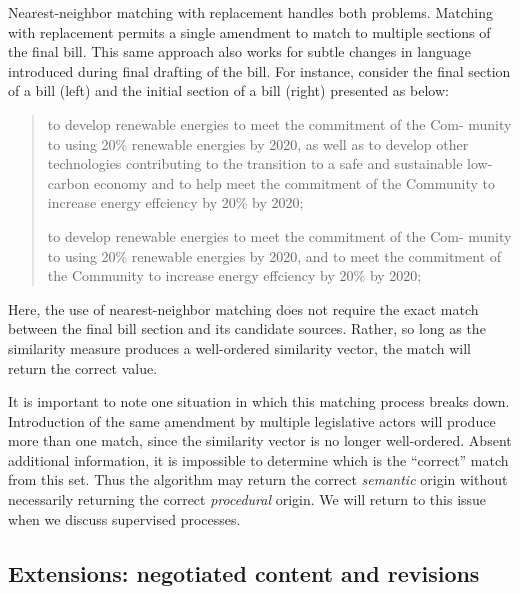 \documentclass[11pt]{article}
\begin{document}
Nearest-neighbor matching with replacement handles both
problems. Matching with replacement permits a single amendment to
match to multiple sections of the final bill. This same approach also works for subtle changes in language
introduced during final drafting of the bill. For instance, consider
the final section of a bill (left) and the initial section of a bill
(right) presented as below:
\begin{quote}
  \begin{minipage}[t]{0.45\linewidth}
    to develop renewable energies to meet the commitment of the Com-
    munity to using 20\% renewable energies by 2020, as well as to
    develop other technologies contributing to the transition to a
    safe and sustainable low-carbon economy and to help meet the commitment of the Community to increase energy effciency by 20\% by
    2020;
  \end{minipage}
  \begin{minipage}[h]{0.08\linewidth}
  \end{minipage}
  \begin{minipage}[t]{0.45\linewidth}
    to develop renewable energies to meet the commitment of the Com-
    munity to using 20\% renewable energies by 2020, and to meet the
    commitment of the Community to increase energy effciency by 20\%
    by 2020;
  \end{minipage}
\end{quote}

Here, the use of nearest-neighbor matching does not require the exact
match between the final bill section and its candidate
sources. Rather, so long as the similarity measure produces a
well-ordered similarity vector, the match will return the correct value.

It is important to note one situation in which this matching process
breaks down. Introduction of the same amendment by multiple
legislative actors will produce more than one match, since the
similarity vector is no longer well-ordered. Absent additional
information, it is impossible to determine which is the ``correct''
match from this set. Thus the algorithm may return the correct
\textit{semantic} origin without necessarily returning the correct
\textit{procedural} origin. We will return to this issue when we discuss
supervised processes.

\subsection{Extensions: negotiated content and revisions}
\label{sec:extens-negot-cont}
\end{document}
